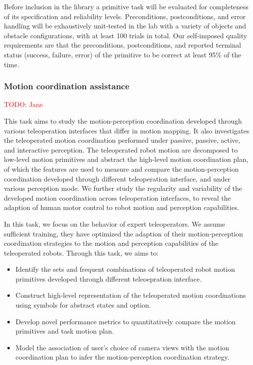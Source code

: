 Before inclusion in the library a primitive task will be evaluated for completeness of its specification and reliability levels.  Preconditions, postconditions, and error handling will be exhaustively unit-tested in the lab with a variety of objects and obstacle configurations, with at least 100 trials in total.  Our self-imposed quality requirements are that the preconditions, postconditions, and reported terminal status (success, failure, error) of the primitive to be correct at least 95\% of the time.



\subsubsection{Motion coordination assistance}
\textcolor{red}{TODO: Jane}

This task aims to study the motion-perception coordination developed through various teleoperation interfaces that differ in motion mapping. It also investigates the teleoperated motion coordination performed under passive, passive, active, and interactive perception. The teleoperated robot motion are decomposed to low-level motion primitives and abstract the high-level motion coordination plan, of which the features are used to measure and compare the motion-perception coordination developed through different teleoperation interface, and under various perception mode. We further study the regularity and variability of the developed motion coordination across teleoperation interfaces, to reveal the adaption of human motor control to robot motion and perception capabilities.

In this task, we focus on the behavior of expert teleoperators. We assume sufficient training, they have optimized the adaption of their motion-perception coordination strategies to the motion and perception capabilities of the teleoperated robots. Through this task, we aims to:

\begin{itemize}

\item Identify the sets and frequent combinations of teleoperated robot motion primitives developed through different teleoepration interface. 

\item Construct high-level representation of the teleoperated motion coordinations using symbols for abstract states and option. 

\item Develop novel performance metrics to quantitatively compare the motion primitives and task motion plan. 

\item Model the association of user's choice of camera views with the motion coordination plan to infer the motion-perception coordination strategy. 

\end{itemize}

